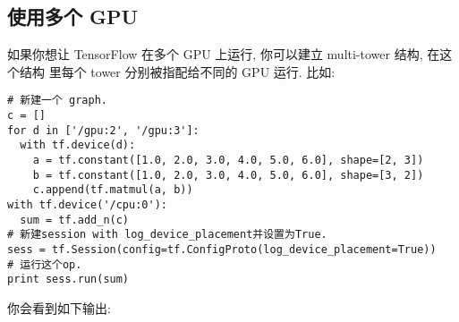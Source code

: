 \begin{Shaded}
\begin{Highlighting}[]
 \NormalTok{):}
  \OperatorTok{=} \NormalTok{tf.constant([}\NormalTok{, }\NormalTok{, }\NormalTok{, }\NormalTok{, }\NormalTok{, }\NormalTok{], shape}\OperatorTok{=}\NormalTok{[}\NormalTok{, }\NormalTok{], name}\OperatorTok{=}\NormalTok{)}
  \OperatorTok{=} \NormalTok{tf.constant([}\NormalTok{, }\NormalTok{, }\NormalTok{, }\NormalTok{, }\NormalTok{, }\NormalTok{], shape}\OperatorTok{=}\NormalTok{[}\NormalTok{, }\NormalTok{], name}\OperatorTok{=}\NormalTok{)}
  \OperatorTok{=} 
\OperatorTok{=} \OperatorTok{=}
      \OperatorTok{=}\OperatorTok{=}\NormalTok{))}
 
\end{Highlighting}
\end{Shaded}

\subsection{使用多个 GPU }\label{ux4f7fux7528ux591aux4e2a-gpu}

如果你想让 TensorFlow 在多个 GPU 上运行, 你可以建立 multi-tower 结构,
在这个结构 里每个 tower 分别被指配给不同的 GPU 运行. 比如:

\begin{verbatim}
# 新建一个 graph.
c = []
for d in ['/gpu:2', '/gpu:3']:
  with tf.device(d):
    a = tf.constant([1.0, 2.0, 3.0, 4.0, 5.0, 6.0], shape=[2, 3])
    b = tf.constant([1.0, 2.0, 3.0, 4.0, 5.0, 6.0], shape=[3, 2])
    c.append(tf.matmul(a, b))
with tf.device('/cpu:0'):
  sum = tf.add_n(c)
# 新建session with log_device_placement并设置为True.
sess = tf.Session(config=tf.ConfigProto(log_device_placement=True))
# 运行这个op.
print sess.run(sum)
\end{verbatim}

你会看到如下输出:


